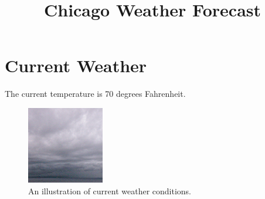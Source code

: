 \documentclass{article}
\title{Chicago Weather Forecast}
\begin{document}
\date{}
\maketitle
\section{Current Weather}
The current temperature is 70 degrees Fahrenheit.
\begin{figure}[H]
\centering
\includegraphics[width=0.3\textwidth]{image.png}
\caption{An illustration of current weather conditions.}
\end{figure}
\end{document}
